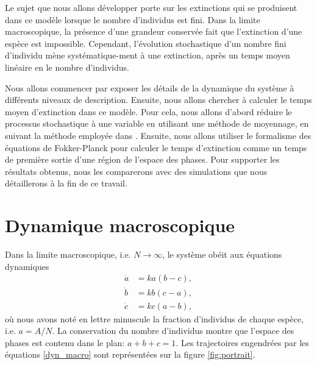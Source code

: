 \documentclass[openany,a4paper,12pt]{article}
\begin{document}
\par Le sujet que nous allons développer porte sur les extinctions qui se produisent dans ce modèle lorsque le nombre d'individus est fini. Dans la limite macroscopique, la présence d'une grandeur conservée fait que l'extinction d'une espèce est impossible. Cependant, l'évolution stochastique d'un nombre fini d'individu mène systématique-ment à une extinction, après un temps moyen linéaire en le nombre d'individus. 

\par Nous allons commencer par exposer les détails de la dynamique du système à différents niveaux de description. Ensuite, nous allons chercher à calculer le temps moyen d'extinction dans ce modèle. Pour cela, nous allons d'abord réduire le processus stochastique à une variable en utilisant une méthode de moyennage, en suivant la méthode employée dans \cite{frey2012}. Ensuite, nous allons utiliser le formalisme des équations de Fokker-Planck pour calculer le temps d'extinction comme un temps de première sortie d'une région de l'espace des phases. Pour supporter les résultats obtenus, nous les comparerons avec des simulations que nous détaillerons à la fin de ce travail. 


\section{Dynamique macroscopique}
\label{section_macro}

\par Dans la limite macroscopique, i.e. $N\rightarrow \infty$, le système obéit aux équations dynamiques
%
\begin{equation}\label{dyn_macro}
\begin{split}
	\dot a &= ka(b-c), \\
	\dot b &= kb(c-a), \\
	\dot c &= kc(a-b),
\end{split}
\end{equation}
%
où nous avons noté en lettre minuscule la fraction d'individus de chaque espèce, i.e. $a=A/N$. La conservation du nombre d'individus montre que l'espace des phases est contenu dans le plan: $a+b+c=1$. Les trajectoires engendrées par les équations \ref{dyn_macro} sont représentées sur la figure \ref{fig:portrait}.
\end{document}
